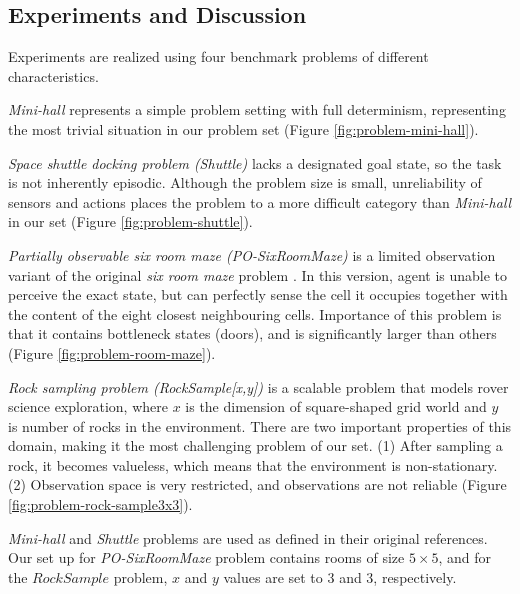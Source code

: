 \documentclass[10pt, conference, compsocconf]{IEEEtran}
\begin{document}
\subsection{Experiments and Discussion}
\label{sec:experiments}

Experiments are realized using four benchmark problems of different characteristics.

\textit{Mini-hall} \cite{littman_learning_1998} represents a simple problem setting with full determinism, representing the most trivial situation in our problem set (Figure \ref{fig:problem-mini-hall}).

\textit{Space shuttle docking problem (Shuttle)} \cite{chrisman_reinforcement_1992}  lacks a designated goal state, so the task is not inherently episodic. Although the problem size is small, unreliability of sensors and actions places the problem to a more difficult category than \textit{Mini-hall} in our set (Figure \ref{fig:problem-shuttle}).

\textit{Partially observable six room maze (PO-SixRoomMaze)}  is a limited observation variant of the original \textit{six room maze} problem \cite{girgin_improving_2010}.
In this version, agent is unable to perceive the exact state, but can perfectly sense the cell it occupies together with the content of the eight closest neighbouring cells. Importance of this problem is that it contains bottleneck states (doors), and is significantly larger than others (Figure \ref{fig:problem-room-maze}).

\textit{Rock sampling problem (RockSample[x,y])} \cite{smith_heuristic_2004} is a scalable problem that models rover science exploration, where $x$ is the dimension of square-shaped grid world and $y$ is number of rocks in the environment. There are two important properties of this domain, making it the most challenging problem of our set. (1) After sampling a rock, it becomes valueless, which means that the environment is non-stationary. (2) Observation space is very restricted, and observations are not reliable (Figure \ref{fig:problem-rock-sample3x3}).


\textit{Mini-hall} and \textit{Shuttle} problems are used as defined in their original references. Our set up for \textit{PO-SixRoomMaze} problem contains rooms of size $5\times5$, and for the $RockSample$ problem, $x$ and $y$ values are set to 3 and 3, respectively. 
\end{document}
